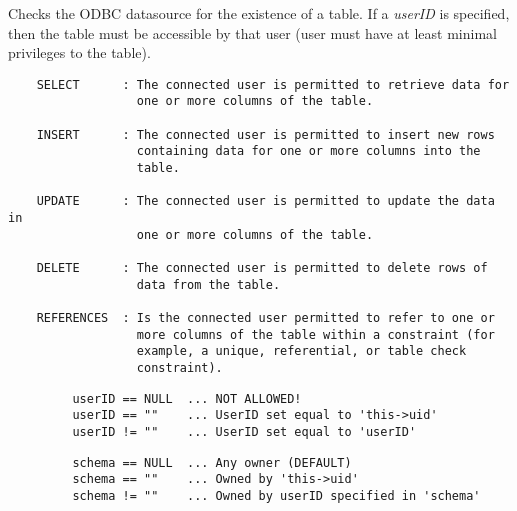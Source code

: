 Checks the ODBC datasource for the existence of a table.  If a {\it userID}
is specified, then the table must be accessible by that user (user must have
at least minimal privileges to the table).



\begin{verbatim}
    SELECT      : The connected user is permitted to retrieve data for
                  one or more columns of the table.

    INSERT      : The connected user is permitted to insert new rows
                  containing data for one or more columns into the
                  table.

    UPDATE      : The connected user is permitted to update the data in
                  one or more columns of the table.

    DELETE      : The connected user is permitted to delete rows of
                  data from the table.

    REFERENCES  : Is the connected user permitted to refer to one or
                  more columns of the table within a constraint (for
                  example, a unique, referential, or table check
                  constraint).
\end{verbatim}


\begin{verbatim}
         userID == NULL  ... NOT ALLOWED!
         userID == ""    ... UserID set equal to 'this->uid'
         userID != ""    ... UserID set equal to 'userID'
\end{verbatim}


\begin{verbatim}
         schema == NULL  ... Any owner (DEFAULT)
         schema == ""    ... Owned by 'this->uid'
         schema != ""    ... Owned by userID specified in 'schema'
\end{verbatim}

